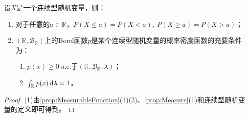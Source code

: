 \begin{property}\label{prop:ContinuousRV}
	设$X$是一个连续型随机变量，则：
	\begin{enumerate}
		\item 对于任意的$a\in\mathbb{R}^{}$，$P(X\leqslant a)=P(X<a),\;P(X\geqslant a)=P(X>a)$；
		\item $(\mathbb{R}^{},\mathcal{B}_{\mathbb{R}^{}})$上的Borel函数$p$是某个连续型随机变量的概率密度函数的充要条件为：
		\begin{enumerate}
			\item $p(x)\geqslant0\;$a.e.于$(\mathbb{R}^{},\mathcal{B}_{\mathbb{R}^{}},\lambda)$；
			\item $\int_{\mathbb{R}^{}}p(x)\mathop{}\!\mathrm{d}\lambda=1$。
		\end{enumerate}
	\end{enumerate}
\end{property}
\begin{proof}
	(1)由\cref{prop:MeasurableFunction}(1)(2)、\cref{prop:Measure}(1)和连续型随机变量的定义即可得到。
\end{proof}